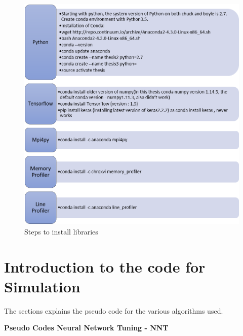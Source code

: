 \begin{figure}
	\centering
	\includegraphics[width=1.0\columnwidth]{introduction/fig4b.png}
	\caption{Steps to install libraries}
\end{figure}

\section{Introduction to the code for Simulation }

The sections explains the pseudo code for the various algorithms used.


\textbf{Pseudo Codes Neural Network Tuning - NNT}

